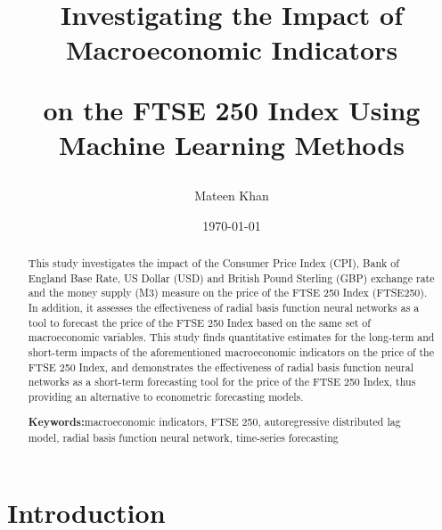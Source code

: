 \documentclass[11pt,a4paper]{article}
\title{Investigating the Impact of Macroeconomic Indicators

on the FTSE 250 Index Using Machine Learning Methods}
\author{Mateen Khan}
\date{\today}
\providecommand{\keywordname}{\textbf{Keywords:}} %
\newcommand{\keywords}[1]{%
  \par\addvspace{\baselineskip}%
  \noindent\keywordname\enspace\ignorespaces#1 %
}
\begin{document}
\maketitle

\begin{abstract}
    This study investigates the impact of the Consumer Price Index (CPI), Bank of England Base Rate, US Dollar (USD) and British Pound Sterling (GBP) exchange rate and the money supply (M3) measure on the price of the FTSE 250 Index (FTSE250).
    In addition, it assesses the effectiveness of radial basis function neural networks as a tool to forecast the price of the FTSE 250 Index based on the same set of macroeconomic variables. This study finds quantitative estimates for the long-term and short-term impacts of the aforementioned macroeconomic indicators on the price of the FTSE 250 Index, and demonstrates the effectiveness of radial basis function neural networks as a short-term forecasting tool for the price of the FTSE 250 Index, thus providing an alternative to econometric forecasting models.

    \keywords{macroeconomic indicators, FTSE 250, autoregressive distributed lag model, radial basis function neural network, time-series forecasting}
\end{abstract}

\section{Introduction}
\end{document}
